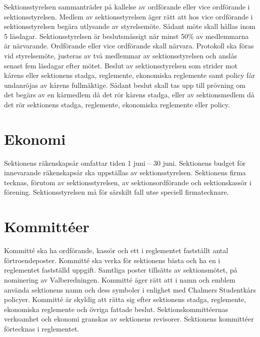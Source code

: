 \documentclass[a4paper]{dteklag}
\begin{document}
\para[Styrelsemöte] Sektionsstyrelsen sammanträder på kallelse av ordförande eller vice ordförande i sektionsstyrelsen.
\para Medlem av sektionsstyrelsen äger rätt att hos vice ordförande i sektionsstyrelsen begära utlysande av styrelsemöte.
\stycke Sådant möte skall hållas inom 5 läsdagar.
\para Sektionsstyrelsen är beslutsmässigt när minst 50\% av medlemmarna är närvarande. Ordförande eller vice ordförande skall närvara.
\para Protokoll ska föras vid styrelsemöte, justeras av två medlemmar av sektionsstyrelsen och anslås senast fem läsdagar efter mötet.
\para[Överklagande] Beslut av sektionsstyrelsen som strider mot kårens eller sektionens stadga, reglemente, ekonomiska reglemente samt policy får undanröjas av kårens fullmäktige.
\stycke Sådant beslut skall tas upp till prövning om det begärs av en kårmedlem då det rör kårens stadga, eller av sektionsmedlem då det rör sektionens stadga, reglemente, ekonomiska reglemente eller policy.

\section{Ekonomi}
\para[Räkenskapsår]
Sektionens räkenskapsår omfattar tiden 1 juni – 30 juni.
\para[Budget] Sektionens budget för innevarande räkenskapsår ska uppställas av sektionsstyrelsen.
\para[Firmateckning] Sektionens firma tecknas, förutom av sektionsstyrelsen, av sektionsordförande och sektionskassör i förening.
\stycke Sektionsstyrelsen må för särskilt fall utse speciell firmatecknare.

\section{Kommittéer}
\para[Definition] Kommitté ska ha ordförande, kassör och ett i reglementet fastställt antal förtroendeposter.
\para Kommitté ska verka för sektionens bästa och ha en i reglementet fastställd uppgift.
\para Samtliga poster tillsätts av sektionsmötet, på nominering av Valberedningen.
\para Kommitté äger rätt att i namn och emblem använda sektionens namn och dess symboler i enlighet med Chalmers Studentkårs policyer.
\para Kommitté är skyldig att rätta sig efter sektionens stadga, reglemente, ekonomiska reglemente och övriga fattade beslut.
\para Sektionskommittéernas verksamhet och ekonomi granskas av sektionens revisorer.
\para Sektionens kommittéer förtecknas i reglementet.
\end{document}
